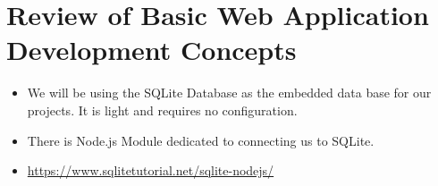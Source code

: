 \section{Review of Basic Web Application Development Concepts}



\begin{itemize}
    \item We will be using the SQLite Database as the embedded data base for our projects. It is light and requires no configuration.
    
    \item There is Node.js Module dedicated to connecting us to SQLite.
    
    \item \url{https://www.sqlitetutorial.net/sqlite-nodejs/}
\end{itemize}




